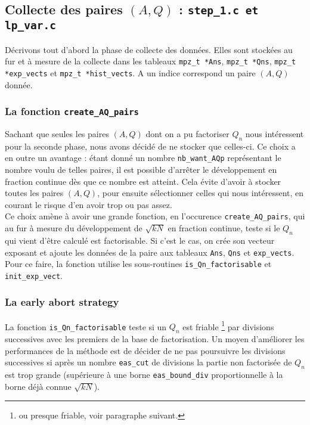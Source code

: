 \subsection{Collecte des paires $(A,Q)$ : \texttt{step\_1.c et lp\_var.c}}

Décrivons tout d'abord la phase de collecte des données. Elles sont
stockées au fur et à mesure de la collecte dans les tableaux \texttt{mpz\_t *Ans}, 
\texttt{mpz\_t *Qns}, \texttt{mpz\_t *exp\_vects} et \texttt{mpz\_t *hist\_vects}.
A un indice correspond un paire $(A,Q)$ donnée.\\ 

\subsubsection{La fonction \texttt{create\_AQ\_pairs}}

Sachant que seules les paires $(A,Q)$ dont on a pu factoriser $Q_n$ nous
intéressent pour la seconde phase, nous avons décidé de ne stocker que celles-ci.
Ce choix a en outre un avantage : étant donné un nombre \texttt{nb\_want\_AQp}
représentant le nombre voulu de telles paires, il est possible d'arrêter le 
développement en fraction continue dès que ce nombre est atteint. Cela évite
d'avoir à stocker toutes les paires $(A,Q)$, pour ensuite sélectionner celles 
qui nous intéressent, en courant le risque d'en avoir trop ou pas assez. \\

Ce choix amène à avoir une grande fonction, en l'occurence 
\texttt{create\_AQ\_pairs}, qui au fur à mesure du développement de $\sqrt{kN}$
en fraction continue, teste si le $Q_n$ qui vient d'être calculé est factorisable.
Si c'est le cas, on crée son vecteur exposant et ajoute les données de la paire
aux tableaux \texttt{Ans}, \texttt{Qns} et \texttt{exp\_vects}. Pour ce faire, la
fonction utilise les sous-routines \texttt{is\_Qn\_factorisable} et 
\texttt{init\_exp\_vect}.

\subsubsection{La \og early abort strategy \fg{}}

La fonction \texttt{is\_Qn\_factorisable} teste si un $Q_n$ est friable 
\footnote {ou presque friable, voir paragraphe suivant.} par divisions successives
avec les premiers de la base de factorisation.  Un moyen d'améliorer les 
performances de la méthode est de décider de ne pas poursuivre les divisions 
successives si après un nombre \texttt{eas\_cut} de divisions la partie non
factorisée de $Q_n$ est trop grande (supérieure à une borne 
\texttt{eas\_bound\_div} proportionnelle à la borne déjà connue $\sqrt{kN}$). 

